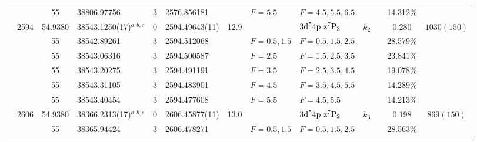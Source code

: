 \begin{table*}
\begin{center}
{\begin{tabular}{:l;l;c;l;c;l;c;l;l;c;c;c;c}
\rowstyle{\itshape}               &        & 55        & 38806.97756$^{}$                 & 3 &   2576.856181      &      & $F=5.5                                   $ & $F=4.5,5.5,6.5                           $ & $      $ &              & 14.312\%  & $          $\\
                                  & 2594   & 54.9380   & 38543.1250(17)$^{a,b,c}$         & 0 &    2594.49643(11)  & 12.9 & $                                        $ & $3\rm{d}^54\rm{p~z}^7\rm{P}_3            $ & $k_{2} $ &              & 0.280     & $ 1030(150)$\\
\rowstyle{\itshape}               &        & 55        & 38542.89261$^{}$                 & 3 &   2594.512068      &      & $F=0.5,1.5                               $ & $F=0.5,1.5,2.5                           $ & $      $ &              & 28.579\%  & $          $\\
\rowstyle{\itshape}               &        & 55        & 38543.06316$^{}$                 & 3 &   2594.500587      &      & $F=2.5                                   $ & $F=1.5,2.5,3.5                           $ & $      $ &              & 23.841\%  & $          $\\
\rowstyle{\itshape}               &        & 55        & 38543.20275$^{}$                 & 3 &   2594.491191      &      & $F=3.5                                   $ & $F=2.5,3.5,4.5                           $ & $      $ &              & 19.078\%  & $          $\\
\rowstyle{\itshape}               &        & 55        & 38543.31105$^{}$                 & 3 &   2594.483901      &      & $F=4.5                                   $ & $F=3.5,4.5,5.5                           $ & $      $ &              & 14.289\%  & $          $\\
\rowstyle{\itshape}               &        & 55        & 38543.40454$^{}$                 & 3 &   2594.477608      &      & $F=5.5                                   $ & $F=4.5,5.5                               $ & $      $ &              & 14.213\%  & $          $\\
                                  & 2606   & 54.9380   & 38366.2313(17)$^{a,b,c}$         & 0 &    2606.45877(11)  & 13.0 & $                                        $ & $3\rm{d}^54\rm{p~z}^7\rm{P}_2            $ & $k_{3} $ &              & 0.198     & $  869(150)$\\
\rowstyle{\itshape}               &        & 55        & 38365.94424$^{}$                 & 3 &   2606.478271      &      & $F=0.5,1.5                               $ & $F=0.5,1.5,2.5                           $ & $      $ &              & 28.563\%  & $          $\\

\end{tabular}}
\end{center}
\end{table*}
